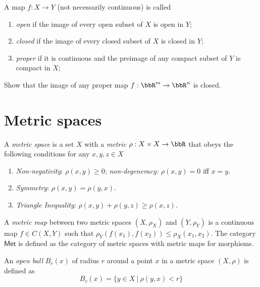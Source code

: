 \begin{defn}
    A map $f:X\to Y$ (not necessarily continuous) is called
    \begin{enumerate}
        \item \emph{open} if the image of every open subset of $X$ is open in $Y$;
        \item \emph{closed} if the image of every closed subset of $X$ is closed in $Y$;
        \item \emph{proper} if it is continuous and the preimage of any compact subset of $Y$ is compact in $X$;
    \end{enumerate}
\end{defn}

\begin{xca}
   Show that the image of any proper map $f:\bbR^m\to\bbR^n$ is closed.
\end{xca}






\section{Metric spaces}

\begin{defn}
    A \emph{metric space} is a set $X$ with a \emph{metric} $\rho:X\times X\rightarrow \bbR $ that obeys the following conditions for any $x,y,z\in X$
\begin{enumerate}
    \item \emph{Non-negativity}: $\rho(x,y)\ge 0$; \emph{non-degeneracy:} $\rho(x,y)=0$ iff $x=y$.
    \item \emph{Symmetry}: $\rho(x,y) = \rho(y,x)$.
    \item \emph{Triangle Inequality}: $\rho(x,y) + \rho(y,z) \ge \rho(x,z)$.
\end{enumerate}
\end{defn}

\begin{defn}
    A \emph{metric map} between two metric spaces $(X,\rho_X)$ and $(Y,\rho_Y)$ is a continuous map $f\in C(X,Y)$ such that $\rho_Y (f(x_1),f(x_2))\leq \rho_X (x_1,x_2)$. The category $\mathsf{Met}$ is defined as the category of metric spaces with metric maps for morphisms.
\end{defn}

\begin{defn}
    An \emph{open ball} $B_r(x)$ of radius $r$ around a point $x$ in a metric space $(X,\rho)$ is defined as
\begin{equation}
    B_r(x) = \{ y\in X ~|~ \rho(y,x)< r \}
\end{equation}
\end{defn}

